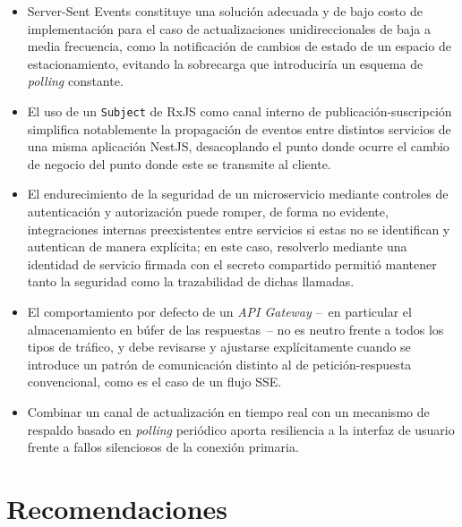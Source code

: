 \documentclass[12pt,letterpaper]{article}
\begin{document}
\begin{itemize}
  \item Server-Sent Events constituye una solución adecuada y de bajo costo de implementación para el caso de actualizaciones unidireccionales de baja a media frecuencia, como la notificación de cambios de estado de un espacio de estacionamiento, evitando la sobrecarga que introduciría un esquema de \emph{polling} constante.
  \item El uso de un \texttt{Subject} de RxJS como canal interno de publicación-suscripción simplifica notablemente la propagación de eventos entre distintos servicios de una misma aplicación NestJS, desacoplando el punto donde ocurre el cambio de negocio del punto donde este se transmite al cliente.
  \item El endurecimiento de la seguridad de un microservicio mediante controles de autenticación y autorización puede romper, de forma no evidente, integraciones internas preexistentes entre servicios si estas no se identifican y autentican de manera explícita; en este caso, resolverlo mediante una identidad de servicio firmada con el secreto compartido permitió mantener tanto la seguridad como la trazabilidad de dichas llamadas.
  \item El comportamiento por defecto de un \emph{API Gateway} --~en particular el almacenamiento en búfer de las respuestas~-- no es neutro frente a todos los tipos de tráfico, y debe revisarse y ajustarse explícitamente cuando se introduce un patrón de comunicación distinto al de petición-respuesta convencional, como es el caso de un flujo SSE.
  \item Combinar un canal de actualización en tiempo real con un mecanismo de respaldo basado en \emph{polling} periódico aporta resiliencia a la interfaz de usuario frente a fallos silenciosos de la conexión primaria.
\end{itemize}

\section{Recomendaciones}
\end{document}
